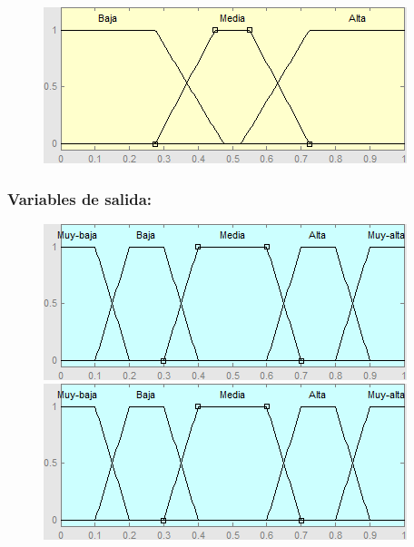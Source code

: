 \begin{figure}[H]
	\centering
	\begin{minipage}{.5\textwidth}
		\centering
		\includegraphics[scale=0.67]{images/variables/vrpd.png}
	\end{minipage}%
	\begin{minipage}{.5\textwidth}
		\centering
	\end{minipage}
\end{figure}


\subsubsection{Variables de salida:}


\begin{figure}[H]
	\centering
	\begin{minipage}{.5\textwidth}
		\centering
		\includegraphics[scale=0.67]{images/variables/salida.png}
	\end{minipage}%
	\begin{minipage}{.5\textwidth}
		\centering
		\includegraphics[scale=0.67]{images/variables/salida.png}
	\end{minipage}
\end{figure}

